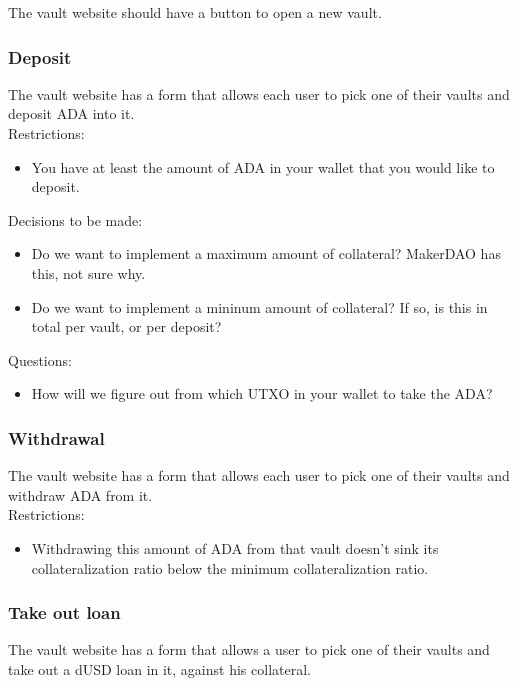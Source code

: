\documentclass{article} %
\begin{document}
The vault website should have a button to open a new vault.

\subsubsection{Deposit}

The vault website has a form that allows each user to pick one of their vaults
and deposit ADA into it. \\

Restrictions:
\begin{itemize}
  \item You have at least the amount of ADA in your wallet that you would like
    to deposit.
\end{itemize}

Decisions to be made:
\begin{itemize}
  \item Do we want to implement a maximum amount of collateral? MakerDAO has
    this, not sure why.
  \item Do we want to implement a mininum amount of collateral? If so, is this
    in total per vault, or per deposit?
\end{itemize}

Questions:
\begin{itemize}
  \item How will we figure out from which UTXO in your wallet to take the ADA?
\end{itemize}

\subsubsection{Withdrawal}

The vault website has a form that allows each user to pick one of their vaults
and withdraw ADA from it. \\

Restrictions:
\begin{itemize}
  \item Withdrawing this amount of ADA from that vault doesn't sink its
    collateralization ratio below the minimum collateralization ratio.
\end{itemize}

\subsubsection{Take out loan}

The vault website has a form that allows a user to pick one of their vaults and
take out a dUSD loan in it, against his collateral. \\
\end{document}
